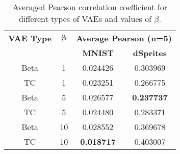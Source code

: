 \begin{table}[H]
    \centering
    \renewcommand{\arraystretch}{1.5}
    \begin{tabular}{|c|c|c|c|}
    \hline
        \textbf{VAE Type} & $\mathbf{\beta}$ &  \multicolumn{2}{|c|}{\textbf{Average Pearson (n=5)}} \\\cline{3-4}
         & & \textbf{MNIST} & \textbf{dSprites} \\
         \hline
        Beta & 1 & 0.024426 & 0.303969 \\
        TC & 1 & 0.023251 & 0.266775\\
        Beta & 5 & 0.026577 & \textbf{0.237737}\\
        TC & 5 & 0.024480 & 0.283371\\
        Beta & 10 & 0.028552 & 0.369678\\
        TC & 10 & \textbf{0.018717} & 0.403007\\
        \hline
    \end{tabular}
    \caption{Averaged Pearson correlation coefficient for different types of VAEs and values of $\beta$.}
    \label{table:disvae_configurations}
\end{table}